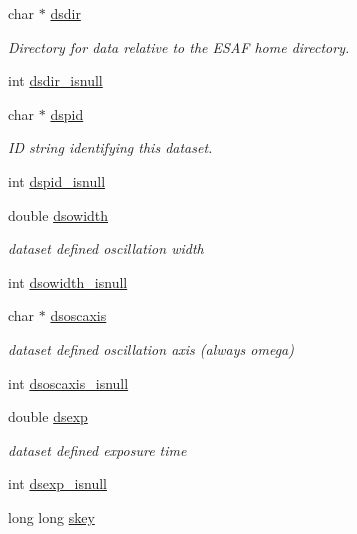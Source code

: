 \begin{DoxyCompactItemize}
char $\ast$ \hyperlink{structlspg__nextshot__struct_ac372e1774a25b3d4bfbb9169762eb39e}{dsdir}
\begin{DoxyCompactList}\small\item\em Directory for data relative to the E\-S\-A\-F home directory. \end{DoxyCompactList}\item 
int \hyperlink{structlspg__nextshot__struct_a8dea57b78b92d67d83ccbb6ed6da13ca}{dsdir\-\_\-isnull}
\item 
char $\ast$ \hyperlink{structlspg__nextshot__struct_a4487e718c2b55a8ab9ebb18329574ae1}{dspid}
\begin{DoxyCompactList}\small\item\em I\-D string identifying this dataset. \end{DoxyCompactList}\item 
int \hyperlink{structlspg__nextshot__struct_a7665485395487756ab448d0c81c84d10}{dspid\-\_\-isnull}
\item 
double \hyperlink{structlspg__nextshot__struct_ad5a8f568a04aa6a13767933062b28f19}{dsowidth}
\begin{DoxyCompactList}\small\item\em dataset defined oscillation width \end{DoxyCompactList}\item 
int \hyperlink{structlspg__nextshot__struct_a5dd3db64790e09bc03499e521bbaa126}{dsowidth\-\_\-isnull}
\item 
char $\ast$ \hyperlink{structlspg__nextshot__struct_a9a62c304e66013e8e5e5618a44f0b6d4}{dsoscaxis}
\begin{DoxyCompactList}\small\item\em dataset defined oscillation axis (always omega) \end{DoxyCompactList}\item 
int \hyperlink{structlspg__nextshot__struct_a51a26391afcacfb4c946fb9e8e9ab6b0}{dsoscaxis\-\_\-isnull}
\item 
double \hyperlink{structlspg__nextshot__struct_a063e4c99201a763c2eb048acfc855efa}{dsexp}
\begin{DoxyCompactList}\small\item\em dataset defined exposure time \end{DoxyCompactList}\item 
int \hyperlink{structlspg__nextshot__struct_ae07498f62ea9c0e2f702b78c87500794}{dsexp\-\_\-isnull}
\item 
long long \hyperlink{structlspg__nextshot__struct_af64a4e3f17752b5f1f05fb15d6f48382}{skey}

\end{DoxyCompactItemize}
